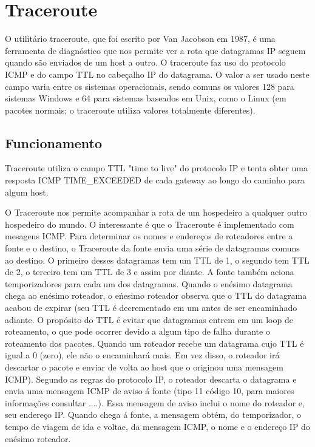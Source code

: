 \documentclass[
	article,			%
	11pt,				%
	oneside,			%
	a4paper,			%
	section=TITLE,		%
	english,			%
	brazil,				%
	sumario=tradicional
	]{abntex2}
\begin{document}
\section{Traceroute}
O utilitário traceroute, que foi escrito por Van Jacobson em 1987, é uma ferramenta de diagnóstico que nos permite ver a rota que datagramas IP seguem quando são enviados de um host a outro. O traceroute faz uso do protocolo ICMP e do campo TTL no cabeçalho IP do datagrama. O valor a ser usado neste campo varia entre os sistemas operacionais, sendo comuns os valores 128 para sistemas Windows e 64 para sistemas baseados em Unix, como o Linux (em pacotes normais; o traceroute utiliza valores totalmente diferentes).

\subsection{Funcionamento}
Traceroute utiliza o campo TTL "time to live" do protocolo IP e tenta obter uma resposta ICMP TIME\_EXCEEDED de cada gateway ao longo do caminho para algum host.

O Traceroute nos permite acompanhar a rota de um hospedeiro a qualquer outro hospedeiro do mundo. O interessante é que o Traceroute é implementado com mesagens ICMP. Para determinar os nomes e endereços de roteadores entre a fonte e o destino, o Traceroute da fonte envia uma série de datagramas comuns ao destino. O primeiro desses datagramas tem um TTL de 1, o segundo tem TTL de 2, o terceiro tem um TTL de 3 e assim por diante. A fonte também aciona temporizadores para cada um dos datagramas. Quando o enésimo datagrama chega ao enésimo roteador, o eńesimo roteador observa que o TTL do datagrama acabou de expirar (seu TTL é decrementado em um antes de ser encaminhado adiante. O propósito do TTL é evitar que datagramas entrem em um loop de roteamento, o que pode ocorrer devido a algum tipo de falha durante o roteamento dos pacotes. Quando um roteador recebe um datagrama cujo TTL é igual a 0 (zero), ele não o encaminhará mais. Em vez disso, o roteador irá descartar o pacote e enviar de volta ao host que o originou uma mensagem ICMP). Segundo as regras do protocolo IP, o roteador descarta o datagrama e envia uma mensagem ICMP de aviso á fonte (tipo 11 código 10, para maiores informações consultar ....). Essa mensagem de aviso inclui o nome do roteador e, seu endereço IP. Quando chega á fonte, a mensagem obtém, do temporizador, o tempo de viagem de ida e voltae, da mensagem ICMP, o nome e o endereço IP do enésimo roteador.\cite{Kurose}
 
\end{document}
